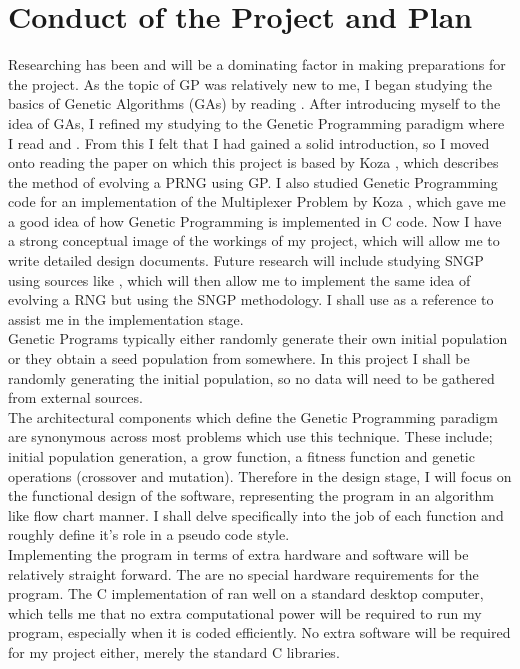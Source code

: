 \documentclass[a4paper,10.5pt]{article}
\begin{document}
\section{Conduct of the Project and Plan}
Researching has been and will be a dominating factor in making preparations for the project. As the topic of GP was relatively new to me, I began studying the basics of Genetic Algorithms (GAs) by reading \cite[p.1 - 24]{mitchell}. After introducing myself to the idea of GAs, I refined my studying to the Genetic Programming paradigm where I read \cite[p.1 - 35]{introgp} and \cite[p.73 - 191]{kozagpbook}. From this I felt that I had gained a solid introduction, so I moved onto reading the paper on which this project is based by Koza \cite{kozarng}, which describes the method of evolving a PRNG using GP. I also studied Genetic Programming code for an implementation of the Multiplexer Problem by Koza \cite{kozamux}, which gave me a good idea of how Genetic Programming is implemented in C code. Now I have a strong conceptual image of the workings of my project, which will allow me to write detailed design documents. Future research will include studying SNGP using sources like \cite{jacksonsngp}, which will then allow me to implement the same idea of evolving a RNG but using the SNGP methodology. I shall use \cite{cprog} as a reference to assist me in the implementation stage.\\

Genetic Programs typically either randomly generate their own initial population or they obtain a seed population from somewhere. In this project I shall be randomly generating the initial population, so no data will need to be gathered from external sources.\\

The architectural components which define the Genetic Programming paradigm are synonymous across most problems which use this technique. These include; initial population generation, a grow function, a fitness function and genetic operations (crossover and mutation). Therefore in the design stage, I will focus on the functional design of the software, representing the program in an algorithm like flow chart manner. I shall delve specifically into the job of each function and roughly define it's role in a pseudo code style. \\

Implementing the program in terms of extra hardware and software will be relatively straight forward. The are no special hardware requirements for the program. The C implementation of \cite{kozamux} ran well on a standard desktop computer, which tells me that no extra computational power will be required to run my program, especially when it is coded efficiently. No extra software will be required for my project either, merely the standard C libraries.\\
\end{document}
